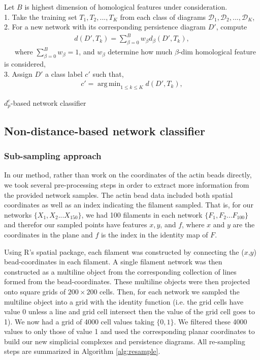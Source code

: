 \documentclass[10pt]{article}
\newcommand{\D}{{\mathcal{D}}}
\DeclareMathOperator*{\argminA}{arg\,min} %
\begin{document}
\begin{algorithm}[!htbp]
	Let $B$ is highest dimension of homological features under consideration.\\ 1. Take the training set $T_1, T_2,..., T_K$ from each class of diagrams $\D_1,\D_2,...,\D_K$, \\
	2. For a new network with its corresponding persistence diagram $D'$, compute
	\begin{align}
	    d(D',T_k)=\sum^B_{\beta=0} w_\beta d_\beta (D',T_k),
	\end{align}
	\ \ \  where $\sum^B_{\beta=0}w_\beta=1$, and $w_\beta$ determine how much $\beta$-dim homological feature is considered,\\
	3. Assign $D'$ a class label $c'$ such that,
	\begin{align}
	    c'=\argminA_{1\leq k \leq K} d(D',T_k),
	\end{align}
	\caption{$d^c_p$-based network classifier}
	\label{alg:dpcclassifier}
\end{algorithm}

\subsection{Non-distance-based network classifier}

\subsubsection{Sub-sampling approach}
In our method, rather than work on the coordinates of the actin beads directly, we took several pre-processing steps in order to extract more information from the provided network samples. The actin bead data included both spatial coordinates as well as an index indicating the filament sampled. That is, for our networks $\{X_1, X_2... X_{150}\}$, we had 100 filaments in each network $\{F_1, F_2... F_{100}\}$ and therefor our sampled points have features $x, y$, and $f$, where  $x$ and $y$ are the coordinates in the plane and $f$ is the index in the identity map of $F$. 

Using R’s spatial package, each filament was constructed by connecting the ($x$,$y$) bead-coordinates in each filament. A single filament network was then constructed as a multiline object from the corresponding collection of lines formed from the bead-coordinates. These multiline objects were then projected onto square grids of $200\times200$ cells. Then, for each network we sampled the multiline object into a grid with the identity function (i.e. the grid cells have value 0 unless a line and grid cell intersect then the value of the grid cell goes to 1). We now had a grid of 4000 cell values taking $\{0,1\}$. We filtered these 4000 values to only those of value 1 and used the corresponding planar coordinates to build our new simplicial complexes and persistence diagrams. All re-sampling steps are summarized in Algorithm \ref{alg:resample}. 
\end{document}
